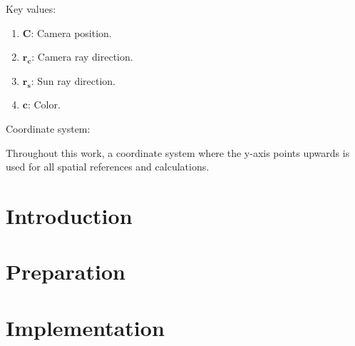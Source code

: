 \documentclass[12pt,a4paper,twoside,openright]{report}
\begin{document}
Key values:

\begin{enumerate}
    \item $\mathbf{C}$: Camera position.
    \item $\mathbf{r_c}$: Camera ray direction.
    \item $\mathbf{r_s}$: Sun ray direction.
    \item $\mathbf{c}$: Color. 
\end{enumerate}

Coordinate system:

Throughout this work, a coordinate system where the y-axis points upwards is used for all spatial references and calculations.



\newpage 

\tableofcontents


\newpage
{}
\setcounter{page}{1}







\chapter{Introduction}


\chapter{Preparation}


\chapter{Implementation}

\end{document}
